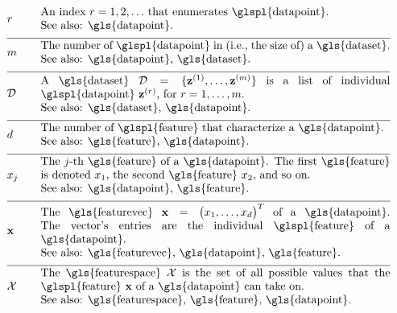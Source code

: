 \begin{align}
	&\sampleidx &\quad & \parbox{.90\textwidth}{An index $\sampleidx=1,2,\ldots$ that 
		enumerates \glspl{datapoint}.
		\\ See also: \gls{datapoint}. }   \nonumber \\[2mm] \hline \nonumber\\[-5mm]
	&\samplesize &\quad &\parbox{.90\textwidth}{The number of \glspl{datapoint} in (i.e., the size of) a \gls{dataset}.
		\\ See also: \gls{datapoint}, \gls{dataset}.} \nonumber \\[2mm] \hline \nonumber\\[-5mm] 
	&\dataset &\quad & \parbox{.90\textwidth}{A \gls{dataset} $\dataset = \{ \datapoint^{(1)},\ldots, \datapoint^{(\samplesize)} \}$ 
		is a list of individual \glspl{datapoint} $\datapoint^{(\sampleidx)}$, for $\sampleidx=1,\ldots,\samplesize$.
		\\ See also: \gls{dataset}, \gls{datapoint}.}   \nonumber \\[2mm] \hline \nonumber\\[-5mm]
	&\featurelen &\quad &\parbox{.90\textwidth}{The number of \glspl{feature} that characterize a \gls{datapoint}.
		\\ See also: \gls{feature}, \gls{datapoint}.}\nonumber \\[2mm] \hline \nonumber\\[-5mm]
	&\feature_{\featureidx} &\quad &\parbox{.90\textwidth}{The $\featureidx$-th \gls{feature} of a \gls{datapoint}. The first \gls{feature} 
		is denoted $\feature_{1}$, the second \gls{feature} $\feature_{2}$, and so on.
		\\ See also: \gls{datapoint}, \gls{feature}. } \nonumber \\[2mm] \hline \nonumber\\[-5mm] 
	&\featurevec &\quad &\parbox{.90\textwidth}{The \gls{featurevec} $\featurevec=\big(\feature_{1},\ldots,\feature_{\featuredim}\big)^{T}$ of a \gls{datapoint}. The vector's entries 
		are the individual \glspl{feature} of a \gls{datapoint}.
		\\ See also: \gls{featurevec}, \gls{datapoint}, \gls{feature}. }\nonumber \\[2mm] \hline \nonumber\\[-5mm]
	&\featurespace &\quad & \parbox{.90\textwidth}{The \gls{featurespace} $\featurespace$ is 
		the set of all possible values that the \glspl{feature} $\featurevec$ of a \gls{datapoint} can take on.
		\\ See also: \gls{featurespace}, \gls{feature}, \gls{datapoint}.} \nonumber 
\end{align}        


